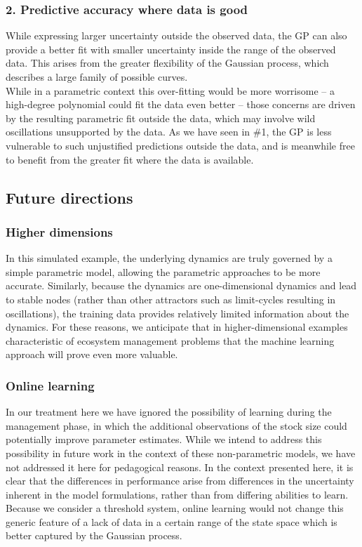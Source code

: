 \documentclass[author-year, review]{elsarticle} %
\begin{document}
\subsubsection{2. Predictive accuracy where data is good}

While expressing larger uncertainty outside the observed data, the GP
can also provide a better fit with smaller uncertainty inside the range
of the observed data. This arises from the greater flexibility of the
Gaussian process, which describes a large family of possible
curves.\\While in a parametric context this over-fitting would be more
worrisome -- a high-degree polynomial could fit the data even better --
those concerns are driven by the resulting parametric fit outside the
data, which may involve wild oscillations unsupported by the data. As we
have seen in \#1, the GP is less vulnerable to such unjustified
predictions outside the data, and is meanwhile free to benefit from the
greater fit where the data is available.

\subsection{Future directions}

\subsubsection{Higher dimensions}

In this simulated example, the underlying dynamics are truly governed by
a simple parametric model, allowing the parametric approaches to be more
accurate. Similarly, because the dynamics are one-dimensional dynamics
and lead to stable nodes (rather than other attractors such as
limit-cycles resulting in oscillations), the training data provides
relatively limited information about the dynamics. For these reasons, we
anticipate that in higher-dimensional examples characteristic of
ecosystem management problems that the machine learning approach will
prove even more valuable.

\subsubsection{Online learning}

In our treatment here we have ignored the possibility of learning during
the management phase, in which the additional observations of the stock
size could potentially improve parameter estimates. While we intend to
address this possibility in future work in the context of these
non-parametric models, we have not addressed it here for pedagogical
reasons. In the context presented here, it is clear that the differences
in performance arise from differences in the uncertainty inherent in the
model formulations, rather than from differing abilities to learn.
Because we consider a threshold system, online learning would not change
this generic feature of a lack of data in a certain range of the state
space which is better captured by the Gaussian process.
\end{document}

